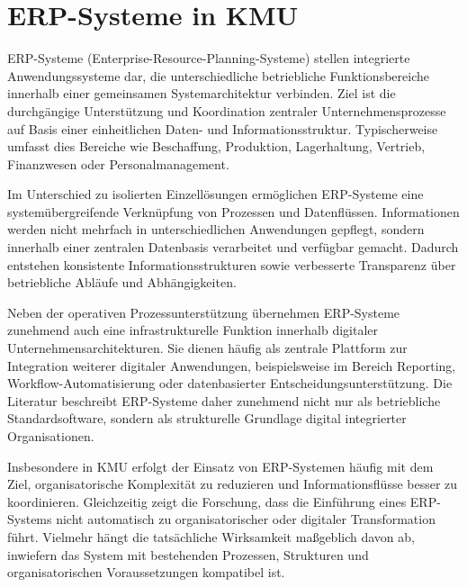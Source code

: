 \section{ERP-Systeme in KMU}
\label{sec:erp_systeme_in_kmu}


ERP-Systeme (Enterprise-Resource-Planning-Systeme) stellen integrierte Anwendungssysteme dar, die unterschiedliche betriebliche 
Funktionsbereiche innerhalb einer gemeinsamen Systemarchitektur verbinden. Ziel ist die durchgängige Unterstützung und Koordination 
zentraler Unternehmensprozesse auf Basis einer einheitlichen Daten- und Informationsstruktur. Typischerweise umfasst dies Bereiche wie 
Beschaffung, Produktion, Lagerhaltung, Vertrieb, Finanzwesen oder Personalmanagement.

Im Unterschied zu isolierten Einzellösungen ermöglichen ERP-Systeme eine systemübergreifende Verknüpfung von Prozessen und Datenflüssen. 
Informationen werden nicht mehrfach in unterschiedlichen Anwendungen gepflegt, sondern innerhalb einer zentralen Datenbasis verarbeitet 
und verfügbar gemacht. Dadurch entstehen konsistente Informationsstrukturen sowie verbesserte Transparenz über betriebliche Abläufe und 
Abhängigkeiten.

Neben der operativen Prozessunterstützung übernehmen ERP-Systeme zunehmend auch eine infrastrukturelle Funktion innerhalb digitaler 
Unternehmensarchitekturen. Sie dienen häufig als zentrale Plattform zur Integration weiterer digitaler Anwendungen, beispielsweise im 
Bereich Reporting, Workflow-Automatisierung oder datenbasierter Entscheidungsunterstützung. Die Literatur beschreibt ERP-Systeme daher 
zunehmend nicht nur als betriebliche Standardsoftware, sondern als strukturelle Grundlage digital integrierter Organisationen.

Insbesondere in KMU erfolgt der Einsatz von ERP-Systemen häufig mit dem Ziel, organisatorische Komplexität zu reduzieren und Informationsflüsse 
besser zu koordinieren. Gleichzeitig zeigt die Forschung, dass die Einführung eines ERP-Systems nicht automatisch zu organisatorischer 
oder digitaler Transformation führt. Vielmehr hängt die tatsächliche Wirksamkeit maßgeblich davon ab, inwiefern das System mit bestehenden 
Prozessen, Strukturen und organisatorischen Voraussetzungen kompatibel ist.

